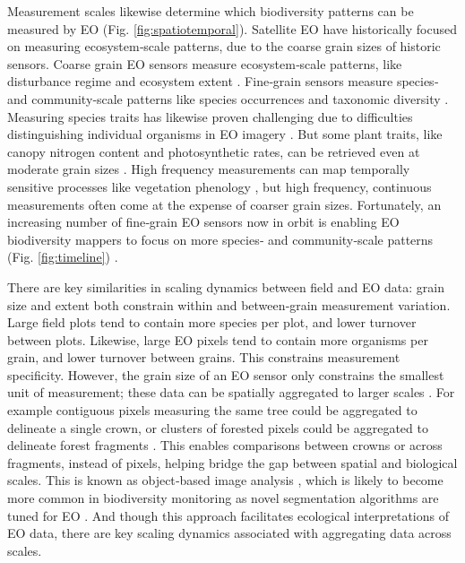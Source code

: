 Measurement scales likewise determine which biodiversity patterns can be measured by EO (Fig. \ref{fig:spatiotemporal}). Satellite EO have historically focused on measuring ecosystem‐scale patterns, due to the coarse grain sizes of historic sensors. Coarse grain EO sensors measure ecosystem‐scale patterns, like disturbance regime \cite{Wang2012-bo, Kogan2015-mz} and ecosystem extent \cite{Maillard2008-dk, Bartsch2009-ze}. Fine‐grain sensors measure species‐ and community‐scale patterns like species occurrences \cite{Immitzer2012-no} and taxonomic diversity \cite{Khare2018-dx}. Measuring species traits has likewise proven challenging due to difficulties distinguishing individual organisms in EO imagery \cite{Nagendra2013-gn, Jetz2016-bx}. But some plant traits, like canopy nitrogen content and photosynthetic rates, can be retrieved even at moderate grain sizes \cite{Martin2008-te,Serbin2014-ta}. High frequency measurements can map temporally sensitive processes like vegetation phenology \cite{Bradley2007-dt}, but high frequency, continuous measurements often come at the expense of coarser grain sizes. Fortunately, an increasing number of fine‐grain EO sensors now in orbit is enabling EO biodiversity mappers to focus on more species‐ and community‐scale patterns (Fig. \ref{fig:timeline}) \cite{Butler2014-tp}.

There are key similarities in scaling dynamics between field and EO data: grain size and extent both constrain within and between‐grain measurement variation. Large field plots tend to contain more species per plot, and lower turnover between plots. Likewise, large EO pixels tend to contain more organisms per grain, and lower turnover between grains. This constrains measurement specificity. However, the grain size of an EO sensor only constrains the smallest unit of measurement; these data can be spatially aggregated to larger scales \cite{fisher1997pixel}. For example contiguous pixels measuring the same tree could be aggregated to delineate a single crown, or clusters of forested pixels could be aggregated to delineate forest fragments \cite{Yao2015-dp}. This enables comparisons between crowns or across fragments, instead of pixels, helping bridge the gap between spatial and biological scales. This is known as object‐based image analysis \cite{blaschke2008object}, which is likely to become more common in biodiversity monitoring as novel segmentation algorithms are tuned for EO \cite{NIPS2012_4824,basu2015deepsat}. And though this approach facilitates ecological interpretations of EO data, there are key scaling dynamics associated with aggregating data across scales.

